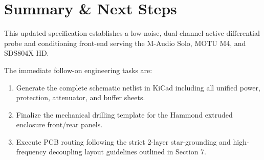 \documentclass[11pt, letterpaper]{article}
\begin{document}
\section{Summary \& Next Steps}

This updated specification establishes a low-noise, dual-channel active differential probe and conditioning front-end serving the M-Audio Solo, MOTU M4, and SDS804X HD.

The immediate follow-on engineering tasks are:
\begin{enumerate}[label=\textbf{\arabic*.}]
    \item Generate the complete schematic netlist in KiCad including all unified power, protection, attenuator, and buffer sheets.
    \item Finalize the mechanical drilling template for the Hammond extruded enclosure front/rear panels.
    \item Execute PCB routing following the strict 2-layer star-grounding and high-frequency decoupling layout guidelines outlined in Section 7.
\end{enumerate}
\end{document}

